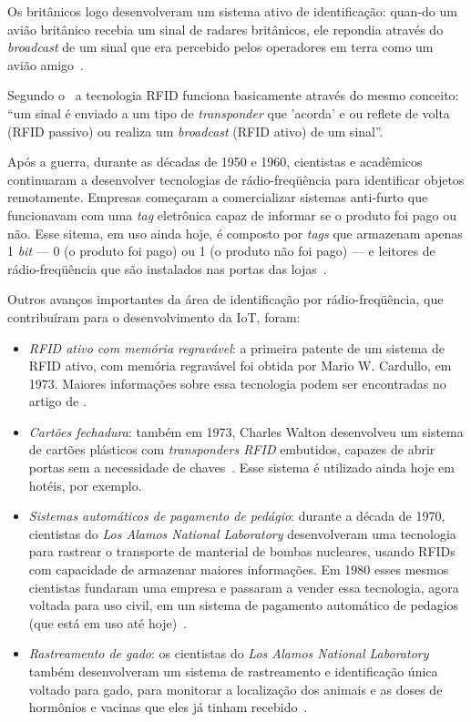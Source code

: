 \documentclass[pdftex, brazil, 12pt, twoside]{article}
\newcommand{\ingles}[1]{\textit{#1}}
\begin{document}
Os britânicos logo desenvolveram um sistema ativo de identificação: quan-do
um avião britânico recebia um sinal de radares britânicos, ele repondia através
do \emph{broadcast} de um sinal que era percebido pelos operadores em terra
como um avião amigo~\citep{IEEEIoTDefinition}.

Segundo o~\citet{IEEEIoTDefinition} a tecnologia RFID funciona basicamente
através do mesmo conceito: ``um sinal é enviado a um tipo de \emph{transponder}
que 'acorda' e ou reflete de volta (RFID passivo) ou realiza
um \emph{broadcast} (RFID ativo) de um sinal''.

Após a guerra, durante as décadas de 1950 e 1960, cientistas e acadêmicos
continuaram a desenvolver tecnologias de rádio-freqüência para identificar
objetos remotamente. Empresas começaram a comercializar sistemas anti-furto
que funcionavam com uma \ingles{tag} eletrônica capaz de informar se o produto
foi pago ou não. Esse sitema, em uso ainda hoje, é composto por \ingles{tags}
que armazenam apenas 1 \ingles{bit} --- 0 (o produto foi pago) ou 1 (o produto não
foi pago) --- e leitores de rádio-freqüência que são instalados nas portas
das lojas~\citep{IEEEIoTDefinition}.

Outros avanços importantes da área de identificação por rádio-freqüência, que
contribuíram para o desenvolvimento da IoT, foram:

\begin{itemize}
\item \emph{RFID ativo com memória regravável}: a primeira patente de um sistema de RFID ativo,
  com memória regravável foi obtida por Mario W. Cardullo, em 1973. Maiores informações
  sobre essa tecnologia podem ser encontradas no artigo de \citet{CardulloRFIDGenesis2003}.
\item \emph{Cartões fechadura}: também em 1973, Charles Walton desenvolveu um sistema
  de cartões plásticos com \ingles{transponders RFID} embutidos, capazes de abrir
  portas sem a necessidade de chaves~\citep{IEEEIoTDefinition}. Esse sistema é
  utilizado ainda hoje em hotéis, por exemplo.
\item \emph{Sistemas automáticos de pagamento de pedágio}: durante a década de 1970,
  cientistas do \emph{Los Alamos National Laboratory} desenvolveram uma tecnologia
  para rastrear o transporte de manterial de bombas nucleares, usando RFIDs com
  capacidade de armazenar maiores informações. Em 1980 esses mesmos cientistas
  fundaram uma empresa e passaram a vender essa tecnologia, agora voltada
  para uso civil, em um sistema de pagamento automático de pedagios (que está em uso
  até hoje)~\citep{IEEEIoTDefinition}.
\item \emph{Rastreamento de gado}: os cientistas do \emph{Los Alamos National Laboratory}
  também desenvolveram um sistema de rastreamento e identificação única voltado
  para gado, para monitorar a localização dos animais e as doses de hormônios e
  vacinas que eles já tinham recebido~\citep{IEEEIoTDefinition}.
\end{itemize}
\end{document}
